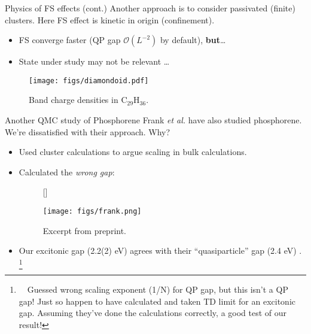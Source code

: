 \documentclass[10pt, pdf, hyperref={draft}, usenames, dvipsnames]{beamer}
\begin{document}
\begin{frame}{Physics of FS effects (cont.)}
Another approach is to consider passivated (finite) clusters. Here FS effect
is kinetic in origin (confinement).
\begin{itemize}
  \item FS converge faster (QP gap $\mathcal{O}(L^{-2})$ by default), {\bf but}\ldots
  \item State under study may not be relevant %
  \ldots
\end{itemize}
\begin{figure}[H]
  \centering
  \texttt{[image: figs/diamondoid.pdf]}
  \caption{Band charge densities in C$_{29}$H$_{36}$.}
\label{fig:diamondoid}
\end{figure}
\end{frame}

\begin{frame}{Another QMC study of Phosphorene}
Frank \textit{et al.} have also studied phosphorene. We're
dissatisfied with their approach. Why?
\begin{itemize}
  \item Used cluster calculations to argue scaling in bulk calculations.
  \item Calculated the \textit{wrong gap}:
\begin{figure}[H]
  [\FBwidth]
  {\caption{Excerpt from preprint.}\label{fig:frank}}
  {\texttt{[image: figs/frank.png]}}
\end{figure}
  \item Our excitonic gap (2.2(2) eV) agrees with their ``quasiparticle'' gap
  (2.4 eV) \smiley{}. \footnote{~~Guessed wrong scaling exponent (1/N) for QP gap, but
  this isn't a QP gap! Just so happen to have calculated and taken TD limit for
  an excitonic gap.  Assuming they've done the calculations correctly, a good
  test of our result!}
\end{itemize}
\end{frame}
\end{document}
